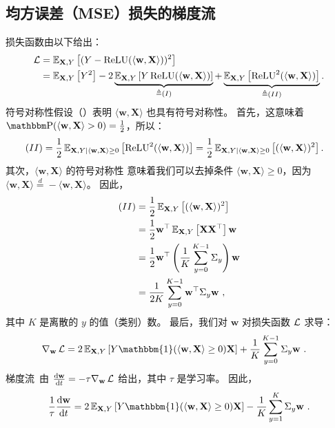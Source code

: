 \subsection{均方误差（MSE）损失的梯度流}
损失函数由以下给出：
\begin{align}
    \operatorname{\mathcal{L}}
    &= \operatorname{\mathbb{E}}_{\mathbf{X},Y}\left[ (Y - \operatorname{ReLU}(\langle \mathbf{w}, \mathbf{X} \rangle) )^2 \right] \notag \\
    &= \operatorname{\mathbb{E}}_{\mathbf{X},Y}\left[ Y^2 \right] - 2 \underbrace{ \operatorname{\mathbb{E}}_{\mathbf{X},Y}\left[ Y \operatorname{ReLU}(\langle \mathbf{w}, \mathbf{X} \rangle) \right] }_{\triangleq (I)} + \underbrace{ \operatorname{\mathbb{E}}_{\mathbf{X},Y}\left[ \operatorname{ReLU}^2(\langle \mathbf{w}, \mathbf{X} \rangle) \right] }_{\triangleq (II)}. \label{eq:loss_2relu_neuron}
\end{align}
符号对称性假设（）表明
$\langle \mathbf{w}, \mathbf{X} \rangle$ 也具有符号对称性。
首先，这意味着 $\PR( \langle \mathbf{w}, \mathbf{X} \rangle > 0 ) = \frac{1}{2}$，所以：
\begin{align*}
    (II)
    &= \frac{1}{2} \operatorname{\mathbb{E}}_{\mathbf{X},Y \mid \langle \mathbf{w}, \mathbf{X} \rangle \geq 0}\left[ \operatorname{ReLU}^2(\langle \mathbf{w}, \mathbf{X} \rangle) \right]
    = \frac{1}{2} \operatorname{\mathbb{E}}_{\mathbf{X},Y \mid \langle \mathbf{w}, \mathbf{X} \rangle \geq 0}\left[ (\langle \mathbf{w}, \mathbf{X} \rangle)^2 \right].
\end{align*}
其次，$\langle \mathbf{w}, \mathbf{X} \rangle$ 的符号对称性
意味着我们可以去掉条件 $\langle \mathbf{w}, \mathbf{X} \rangle \geq 0$，因为 $\langle \mathbf{w}, \mathbf{X} \rangle \overset{d}{=} -\langle \mathbf{w}, \mathbf{X} \rangle$。
因此，
\begin{align*}
    (II)
    &= \frac{1}{2} \operatorname{\mathbb{E}}_{\mathbf{X},Y}\left[ (\langle \mathbf{w}, \mathbf{X} \rangle)^2 \right] \\
    &= \frac{1}{2} \mathbf{w}^\top \operatorname{\mathbb{E}}_{\mathbf{X},Y} \left[ \mathbf{X} \mathbf{X}^\top \right] \mathbf{w} \\
    &= \frac{1}{2} \mathbf{w}^\top \left( \frac{1}{K} \sum_{y=0}^{K-1} \Sigma_y \right) \mathbf{w}  \\
    &= \frac{1}{2K} \sum_{y=0}^{K-1} \mathbf{w}^\top \Sigma_y \mathbf{w}~,
\end{align*}
其中 $K$ 是离散的 $y$ 的值（类别）数。
最后，我们对 $\mathbf{w}$ 对损失函数 $\operatorname{\mathcal{L}}$ 求导：
\begin{align*}
  \nabla_\mathbf{w} \LL &= 2 \E_{\mathbf{X},Y}\left[ Y \mathbbm{1}( \langle \mathbf{w}, \mathbf{X} \rangle \geq 0) \mathbf{X} \right] + \frac{1}{K} \sum_{y=0}^{K-1} \Sigma_y \mathbf{w}~.
\end{align*}
梯度流~\cite{elkabetz2024continuous}由 $\frac{\mathrm{d}\mathbf{w}}{\mathrm{d}t} = -\tau \nabla_\mathbf{w} \operatorname{\mathcal{L}}$ 给出，其中 $\tau$ 是学习率。
因此，
\begin{equation}
  \frac{1}{\tau} \frac{\mathrm{d}\mathbf{w}}{\mathrm{d}t}
    = 2 \E_{\mathbf{X},Y}\left[ Y \mathbbm{1}( \langle \mathbf{w}, \mathbf{X} \rangle \geq 0) \mathbf{X} \right] - \frac{1}{K} \sum_{y=1}^{K} \Sigma_y \mathbf{w}~. \label{eq:gradient_flow_two}
\end{equation}
